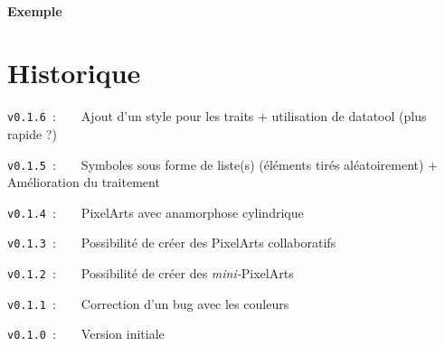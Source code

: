 \documentclass{article}
\begin{document}
\subsection{Exemple}

\begin{PresentationCode}{}


\end{PresentationCode}

\pagebreak

\part{Historique}

\verb|v0.1.6|~:~~~~Ajout d'un style pour les traits + utilisation de \textsf{datatool} (plus rapide ?)

\verb|v0.1.5|~:~~~~Symboles sous forme de liste(s) (éléments tirés aléatoirement) + Amélioration du traitement

\verb|v0.1.4|~:~~~~PixelArts avec anamorphose cylindrique

\verb|v0.1.3|~:~~~~Possibilité de créer des PixelArts collaboratifs

\verb|v0.1.2|~:~~~~Possibilité de créer des \textit{mini-}PixelArts

\verb|v0.1.1|~:~~~~Correction d'un bug avec les couleurs

\verb|v0.1.0|~:~~~~Version initiale
\end{document}
